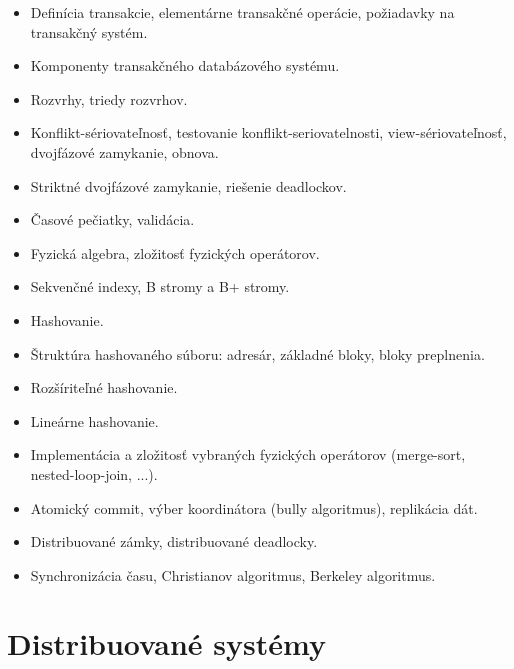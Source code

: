 \documentclass[a4paper]{report}
\begin{document}
\begin{zadanie}[Transakcie]
\begin{itemize}
 \item Definícia transakcie, elementárne transakčné operácie, požiadavky na transakčný systém.
 \item Komponenty transakčného databázového systému.
 \item Rozvrhy, triedy rozvrhov.
 \item Konflikt-sériovateľnosť, testovanie konflikt-seriovatelnosti, view-sériovateľnosť, dvojfázové zamykanie, obnova.
 \item Striktné dvojfázové zamykanie, riešenie deadlockov.
 \item Časové pečiatky, validácia.
\end{itemize}
\end{zadanie}

\begin{zadanie}
\begin{itemize}
 \item Fyzická algebra, zložitosť fyzických operátorov.
 \item Sekvenčné indexy, B stromy a B+ stromy.
 \item Hashovanie.
 \item Štruktúra hashovaného súboru: adresár, základné bloky, bloky preplnenia.
 \item Rozšíriteľné hashovanie.
 \item Lineárne hashovanie.
 \item Implementácia a zložitosť vybraných fyzických operátorov (merge-sort, nested-loop-join, ...).
\end{itemize}
\end{zadanie}

\begin{zadanie}
\begin{itemize}
 \item Atomický commit, výber koordinátora (bully algoritmus), replikácia dát.
 \item Distribuované zámky, distribuované deadlocky.
 \item Synchronizácia času, Christianov algoritmus, Berkeley algoritmus.
\end{itemize}
\end{zadanie}

\chapter{Distribuované systémy}
\end{document}
